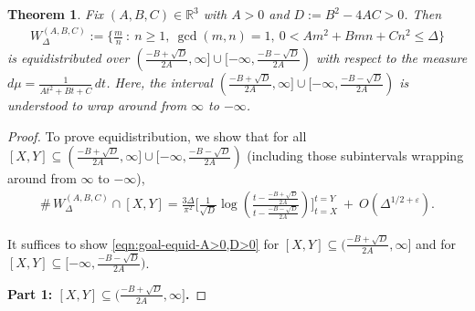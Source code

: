 \documentclass[11pt,letterpaper,reqno]{amsart}
\newtheorem{theorem}{Theorem}[section]
\numberwithin{equation}{section}
\numberwithin{figure}{section}
\numberwithin{table}{section}
\newcommand{\lrp}[1]{\left(#1\right)}
\newcommand{\RR}{\mathbb{R}}
\begin{document}
{
\renewcommand{\thetheorem}{\ref{thm:equid-WABC} (\(A>0,D>0\))}
\begin{theorem} \label{thm:equid-W--A>0,D>0}
Fix $(A,B,C) \in \RR^3$ with $A > 0$ and $D := B^2-4AC > 0$. Then
\begin{align}
    W_{\Delta}^{(A,B,C)} := \Big\{\frac{m}{n} ~:~ n\ge 1,~ \gcd(m,n)=1,~   0 < A m^2 + B mn + C n^2  \le \Delta
    \Big\}
\end{align}
is equidistributed over $(\frac{-B+\sqrt{D}}{2A},\infty] \cup [-\infty,\frac{-B-\sqrt{D}}{2A})$ with respect to the measure $d\mu = \frac{1}{At^2+Bt+C} \,dt$. Here, the interval $(\frac{-B+\sqrt{D}}{2A},\infty] \cup [-\infty,\frac{-B-\sqrt{D}}{2A})$ is understood to wrap around from $\infty$ to $-\infty$.
\end{theorem}
}
\begin{proof}
To prove equidistribution, we show that for all $[X,Y] \subseteq (\frac{-B+\sqrt{D}}{2A},\infty] \cup [-\infty,\frac{-B-\sqrt{D}}{2A})$ (including those subintervals wrapping around from $\infty$ to $-\infty$),
\begin{align} \label{eqn:goal-equid-A>0,D>0} \tag{$**$}
    \#\, W_{\Delta}^{(A,B,C)} \cap [X,Y] =
    \frac{3\Delta}{\pi^2}
    \Bigg[ 
        \frac{1}{\sqrt D}
        \log\lrp{
        \frac{
            t - \frac{-B+\sqrt{D}}{2A}
        }{
            t - \frac{-B-\sqrt{D}}{2A}
        }
        }
    \Bigg]_{t=X}^{t=Y} 
         ~+~ O(\Delta^{1/2+\varepsilon}).
\end{align}




It suffices to show \eqref{eqn:goal-equid-A>0,D>0} for $[X,Y] \subseteq (\frac{-B+\sqrt{D}}{2A},\infty]$ and for $[X,Y] \subseteq [-\infty, \frac{-B-\sqrt{D}}{2A})$.

\noindent
\textbf{Part 1: $[X,Y] \subseteq (\frac{-B+\sqrt{D}}{2A},\infty]$.}


\end{proof}
\end{document}
